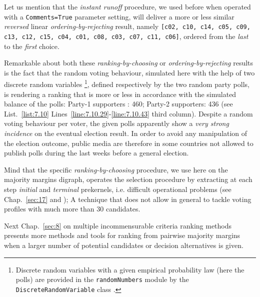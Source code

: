 Let us mention that the \emph{instant runoff} procedure, we used before when operated with a \texttt{Comments=True} parameter setting, will deliver a more or less similar \emph{reversed} linear \emph{ordering-by-rejecting} result, namely \texttt{[c02, c10, c14, c05, c09, c13, c12, c15, c04, c01, c08, c03, c07, c11, c06]}, ordered from the \emph{last} to the \emph{first} choice.

Remarkable about both these \emph{ranking-by-choosing} or \emph{ordering-by-rejecting} results is the fact that the random voting behaviour, simulated here with the help of two discrete random variables \footnote{Discrete random variables with a given empirical probability law (here the polls) are provided in the \texttt{randomNumbers} module by the \texttt{DiscreteRandomVariable} class \citep{CPSTAT-L4}.}, defined respectively by the two random party polls, is rendering a ranking that is more or less in accordance with the simulated balance of the polls: Party-1 supporters : 460;  Party-2 supporters: 436 (see List.~\vref{list:7.10} Lines~\ref{line:7.10.29}-\ref{line:7.10.43} third column). Despite a random voting behaviour per voter, the given polls apparently show a \emph{very strong incidence} on the eventual election result. In order to avoid any manipulation of the election outcome, public media are therefore in some countries not allowed to publish polls during the last weeks before a general election.

Mind that the specific \emph{ranking-by-choosing} procedure, we use here on the majority margins digraph, operates the selection procedure by extracting at each step \emph{initial} and \emph{terminal} prekernels, i.e. difficult operational problems (see Chap.~\ref{sec:17} and \citealp{BIS-1999}); A technique that does not allow in general to tackle voting profiles with much more than 30 candidates.

\vspace{\baselineskip}

Next Chap.~\ref{sec:8} on multiple incommensurable criteria ranking methods presents more methods and tools for ranking from pairwise majority margins when a larger number of potential candidates or decision alternatives is given.  


%
%
